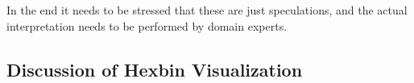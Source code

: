 In the end it needs to be stressed that these are just speculations, and the actual interpretation needs to be performed by domain experts. 


\subsection{Discussion of Hexbin Visualization}


